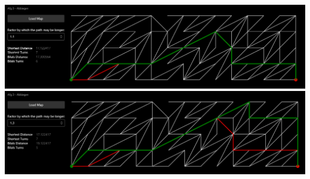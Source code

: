 \documentclass{article}
\theoremstyle{nonumberplain}
\begin{document}
\subsection{}

\begin{center}
\includegraphics{examples/1_10.png}
\includegraphics{examples/1_30.png}
\end{center}

\subsection{}
\end{document}
